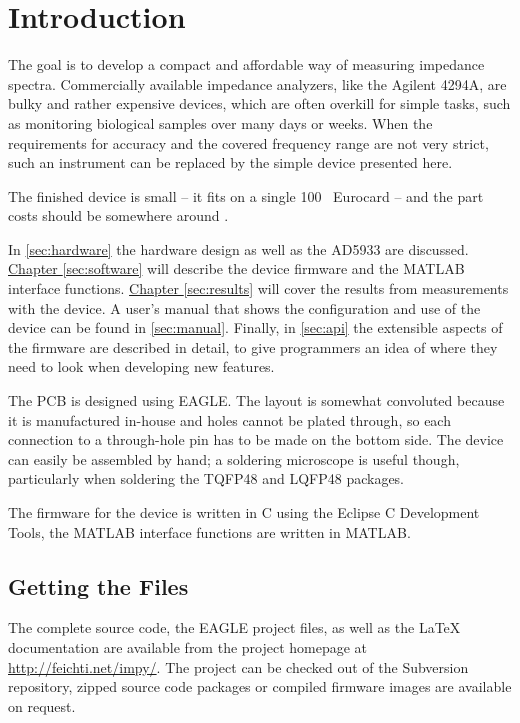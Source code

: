 \chapter{Introduction}

The goal is to develop a compact and affordable way of measuring impedance spectra. Commercially available impedance
analyzers, like the Agilent 4294A, are bulky and rather expensive devices, which are often overkill for simple
tasks, such as monitoring biological samples over many days or weeks. When the requirements for accuracy and the covered
frequency range are not very strict, such an instrument can be replaced by the simple device presented here.

The finished device is small -- it fits on a single \unit{100 }{\milli\meter} Eurocard -- and the part costs
should be somewhere around .

In \autoref{sec:hardware} the hardware design as well as the AD5933 are discussed.
\hyperref[sec:software]{Chapter \ref*{sec:software}} will describe the device firmware and the MATLAB interface
functions.
\hyperref[sec:results]{Chapter \ref*{sec:results}} will cover the results from measurements with the device.
A user's manual that shows the configuration and use of the device can be found in \autoref{sec:manual}.
Finally, in \autoref{sec:api} the extensible aspects of the firmware are described in detail, to give programmers an
idea of where they need to look when developing new features.

The PCB is designed using EAGLE\footnotemark{}. The layout is somewhat convoluted because it is manufactured in-house
and holes cannot be plated through, so each connection to a through-hole pin has to be made on the bottom side.
The device can easily be assembled by hand; a soldering microscope is useful though, particularly when soldering the
TQFP48 and LQFP48 packages.


The firmware for the device is written in C using the Eclipse C Development Tools\footnotemark{}, the MATLAB interface
functions are written in MATLAB.



\section{Getting the Files}

The complete source code, the EAGLE project files, as well as the \LaTeX{} documentation are available from the project
homepage at \url{http://feichti.net/impy/}. The project can be checked out of the Subversion repository, zipped source
code packages or compiled firmware images are available on request.
